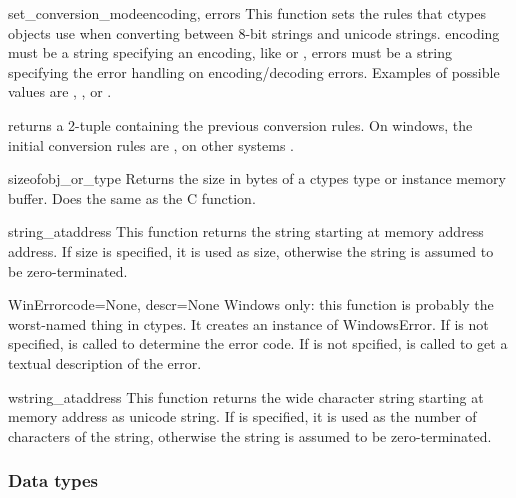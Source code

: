 \begin{funcdesc}{set_conversion_mode}{encoding, errors}
This function sets the rules that ctypes objects use when
converting between 8-bit strings and unicode strings. encoding
must be a string specifying an encoding, like  or
, errors must be a string specifying the error handling
on encoding/decoding errors. Examples of possible values are
, , or .

 returns a 2-tuple containing the previous
conversion rules. On windows, the initial conversion rules are
, on other systems .
\end{funcdesc}

\begin{funcdesc}{sizeof}{obj_or_type}
Returns the size in bytes of a ctypes type or instance memory
buffer. Does the same as the C  function.
\end{funcdesc}

\begin{funcdesc}{string_at}{address}
This function returns the string starting at memory address
address. If size is specified, it is used as size, otherwise the
string is assumed to be zero-terminated.
\end{funcdesc}

\begin{funcdesc}{WinError}{code=None, descr=None}
Windows only: this function is probably the worst-named thing in
ctypes. It creates an instance of WindowsError. If  is not
specified,  is called to determine the error
code. If  is not spcified,  is called to
get a textual description of the error.
\end{funcdesc}

\begin{funcdesc}{wstring_at}{address}
This function returns the wide character string starting at memory
address  as unicode string. If  is specified,
it is used as the number of characters of the string, otherwise
the string is assumed to be zero-terminated.
\end{funcdesc}


\subsubsection{Data types\label{ctypes-data-types}}

